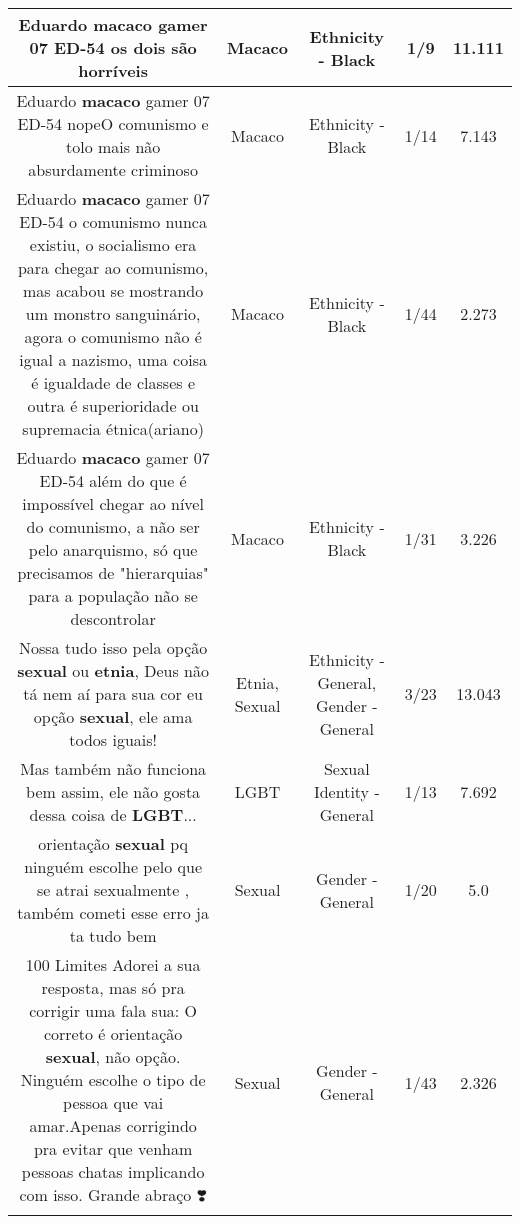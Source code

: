 \documentclass[11pt]{article}
\newlength\mylength
\begin{document}
\begin{center}
\begin{longtable}{|C{.65\mylength}|C{.30\mylength}|C{.12\mylength}|C{.12\mylength}|C{.12\mylength}|}
  \small Eduardo \textbf{macaco} gamer 07 ED-54 os dois são horríveis\normalsize   & Macaco & Ethnicity - Black & 1/9 & 11.111 \\  \hline
  \small Eduardo \textbf{macaco} gamer 07 ED-54 nopeO comunismo e tolo mais não absurdamente criminoso\normalsize   & Macaco & Ethnicity - Black & 1/14 & 7.143 \\  \hline
  \small Eduardo \textbf{macaco} gamer 07 ED-54  o comunismo nunca existiu, o socialismo era para chegar ao comunismo, mas acabou se mostrando um monstro sanguinário, agora o comunismo não é igual a nazismo, uma coisa é igualdade de classes e outra é superioridade ou supremacia  étnica(ariano)\normalsize   & Macaco & Ethnicity - Black & 1/44 & 2.273 \\  \hline
  \small Eduardo \textbf{macaco} gamer 07 ED-54  além do que é impossível chegar ao nível do comunismo, a não ser pelo anarquismo, só que precisamos de "hierarquias" para  a população  não se descontrolar\normalsize   & Macaco & Ethnicity - Black & 1/31 & 3.226 \\  \hline
  \small Nossa tudo isso pela opção \textbf{sexual} ou \textbf{etnia}, Deus não tá nem aí para sua cor eu opção \textbf{sexual}, ele ama todos iguais!\normalsize   & Etnia, Sexual & Ethnicity - General, Gender - General & 3/23 & 13.043 \\  \hline
  \small Mas também não funciona bem assim, ele não gosta dessa coisa de \textbf{LGBT}...\normalsize   & LGBT & Sexual Identity - General & 1/13 & 7.692 \\  \hline
  \small * orientação \textbf{sexual} pq ninguém escolhe pelo que se atrai sexualmente , também cometi esse erro ja ta tudo bem\normalsize   & Sexual & Gender - General & 1/20 & 5.0 \\  \hline
  \small 100 Limites Adorei a sua resposta, mas só pra corrigir uma fala sua: O correto é orientação \textbf{sexual}, não opção. Ninguém escolhe o tipo de pessoa que vai amar.Apenas corrigindo pra evitar que venham pessoas chatas implicando com isso. Grande abraço ❣️\normalsize   & Sexual & Gender - General & 1/43 & 2.326 \\  \hline

\end{longtable}
\end{center}
\end{document}
